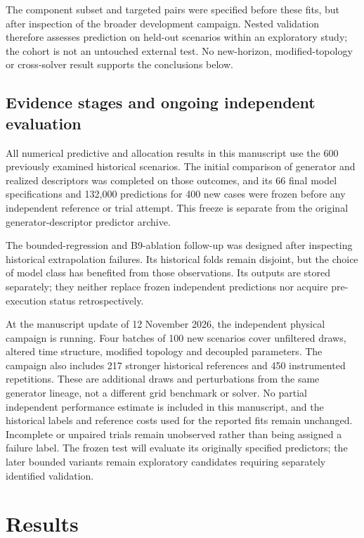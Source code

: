 The component subset and targeted pairs were specified before these fits,
but after inspection of the broader development campaign. Nested validation
therefore assesses prediction on held-out scenarios within an exploratory
study; the cohort is not an untouched external test. No new-horizon,
modified-topology or cross-solver result supports the conclusions below.

\subsection{Evidence stages and ongoing independent evaluation}
\label{sec:evidence_status}
All numerical predictive and allocation results in this manuscript use the
600 previously examined historical scenarios. The initial comparison of
generator and realized descriptors was completed on those outcomes, and
its 66 final model specifications and 132,000 predictions for 400 new cases
were frozen before any independent reference or trial attempt. This freeze
is separate from the original generator-descriptor predictor archive.

The bounded-regression and B9-ablation follow-up was designed after inspecting
historical extrapolation failures. Its historical folds remain disjoint,
but the choice of model class has benefited from those observations. Its
outputs are stored separately; they neither replace frozen independent
predictions nor acquire pre-execution status retrospectively.

At the manuscript update of 12 November 2026, the independent physical
campaign is running. Four batches of 100 new scenarios cover unfiltered
draws, altered time structure, modified topology and decoupled parameters.
The campaign also includes 217 stronger historical references and 450
instrumented repetitions. These are additional draws and perturbations
from the same generator lineage, not a different grid benchmark or solver.
No partial independent performance estimate is included in this manuscript,
and the historical labels and reference costs used for the reported fits
remain unchanged. Incomplete or unpaired trials remain unobserved rather
than being assigned a failure label. The frozen test will evaluate its
originally specified predictors; the later bounded variants remain
exploratory candidates requiring separately identified validation.

\section{Results}

